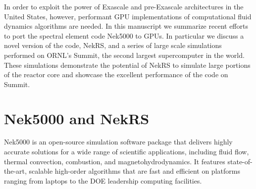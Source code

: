 \documentclass{anstrans}
\begin{document}
\medskip
In order to exploit the power of Exascale and pre-Exascale architectures in the
United States,  however, performant GPU implementations of computational fluid
dynamics algorithms are needed. In this manuscript we summarize recent efforts
to port the spectral element code Nek5000 \cite{nek} to GPUs. In
particular we discuss a novel version of the code, NekRS, and a series of large
scale simulations performed on ORNL's Summit, the second largest supercomputer
in the world. These simulations demonstrate the potential of NekRS to simulate
large portions of the reactor core and showcase the excellent performance of
the code on Summit.

\section{Nek5000 and NekRS}

Nek5000 \cite{nek} is an open-source simulation software package
that delivers highly accurate solutions for a wide range of scientific
applications, including fluid flow, thermal convection, combustion, and
magnetohydrodynamics. It features state-of-the-art, scalable high-order
algorithms that are fast and efficient on platforms ranging from laptops to the
DOE leadership computing facilities.
\end{document}
